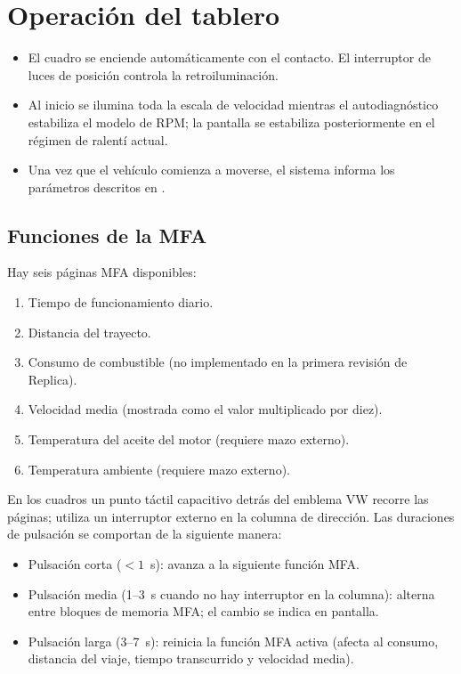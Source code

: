 \section{Operación del tablero}
\begin{itemize}
    \item El cuadro se enciende automáticamente con el contacto. El interruptor de luces de posición controla la retroiluminación.
    \item Al inicio se ilumina toda la escala de velocidad mientras el autodiagnóstico estabiliza el modelo de RPM; la pantalla se estabiliza posteriormente en el régimen de ralentí actual.
    \item Una vez que el vehículo comienza a moverse, el sistema informa los parámetros descritos en .
\end{itemize}

\subsection{Funciones de la MFA}
Hay seis páginas MFA disponibles:
\begin{enumerate}
    \item Tiempo de funcionamiento diario.
    \item Distancia del trayecto.
    \item Consumo de combustible (no implementado en la primera revisión de Replica).
    \item Velocidad media (mostrada como el valor multiplicado por diez).
    \item Temperatura del aceite del motor (requiere mazo externo).
    \item Temperatura ambiente (requiere mazo externo).
\end{enumerate}
En los cuadros \ReplicaGenOneShort{} un punto táctil capacitivo detrás del emblema VW recorre las páginas; \ReplicaNextShort{} utiliza un interruptor externo en la columna de dirección. Las duraciones de pulsación se comportan de la siguiente manera:
\begin{itemize}
    \item Pulsación corta (\(<1\)~s): avanza a la siguiente función MFA.
    \item Pulsación media (1--3~s cuando no hay interruptor en la columna): alterna entre bloques de memoria MFA; el cambio se indica en pantalla.
    \item Pulsación larga (3--7~s): reinicia la función MFA activa (afecta al consumo, distancia del viaje, tiempo transcurrido y velocidad media).
\end{itemize}

